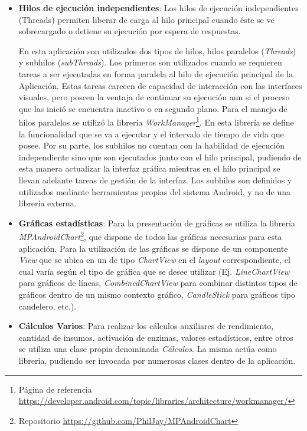 \begin{itemize}
        \item \textbf{Hilos de ejecución independientes}: Los hilos de ejecución independientes (Threads) permiten liberar de carga al hilo principal cuando éste se ve sobrecargado o detiene su ejecución por espera de respuestas. 
        
        \par En esta aplicación son utilizados dos tipos de hilos, hilos paralelos (\textit{Threads}) y subhilos (\textit{subThreads}). Los primeros son utilizados cuando se requieren tareas a ser ejecutadas en forma paralela al hilo de ejecución principal de la Aplicación. Estas tareas carecen de capacidad de interacción con las interfaces visuales, pero poseen la ventaja de continuar su ejecución aun si el proceso que las inició se encuentra inactivo o en segundo plano. Para el manejo de hilos paralelos se utilizó la librería \textit{WorkManager}\footnote{Página de referencia \url{https://developer.android.com/topic/libraries/architecture/workmanager/}}. En esta librería se define la funcionalidad que se va a ejecutar y el intervalo de tiempo de vida que posee. Por su parte, los subhilos no cuentan con la habilidad de ejecución independiente sino que son ejecutados junto con el hilo principal, pudiendo de esta manera actualizar la interfaz gráfica mientras en el hilo principal se llevan adelante tareas de gestión de la interfaz. Los subhilos son definidos y utilizados mediante herramientas propias del sistema Android, y no de una librería externa.
        
        \item \textbf{Gráficas estadísticas}: Para la presentación de gráficas se utiliza la librería \textit{MPAndroidChart}\footnote{Repositorio \url{https://github.com/PhilJay/MPAndroidChart}}, que dispone de todos las gráficas necesarias para esta aplicación. Para la utilización de las gráficas se dispone de un componente \textit{View} que se ubica en un de tipo \textit{ChartView} en el \textit{layout} correspondiente, el cual varía según el tipo de gráfica que se desee utilizar (Ej. \textit{LineChartView} para gráficos de líneas, \textit{CombinedChartView} para combinar distintos tipos de gráficos dentro de un mismo contexto gráfico, \textit{CandleStick} para gráficos tipo candelero, etc.).
        
        \item \textbf{Cálculos Varios}: Para realizar los cálculos auxiliares de rendimiento, cantidad de insumos, activación de enzimas, valores estadísticos, entre otros se utiliza una clase propia denominada \textit{Cálculos}. La misma actúa como librería, pudiendo ser invocada por numerosas clases dentro de la aplicación.
        
     \end{itemize}
     
